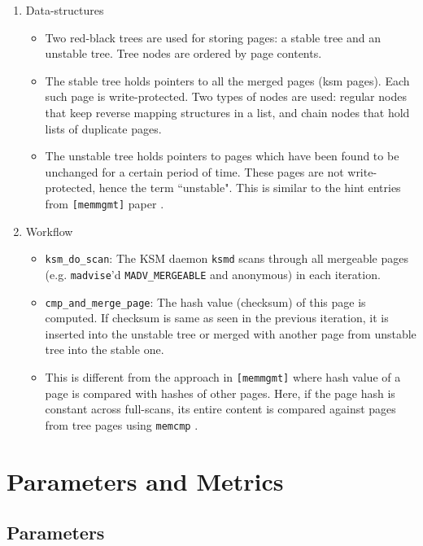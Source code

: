 \documentclass{article}
\begin{document}
\begin{enumerate}
\item Data-structures
    \begin{itemize}
        \item Two red-black trees are used for storing pages: a stable tree and an unstable tree. Tree nodes are ordered by page contents.
        \item The stable tree holds pointers to all the merged pages (ksm pages). Each such page is write-protected. Two types of nodes are used: regular nodes that keep reverse mapping structures in a list, and chain nodes that hold lists of duplicate pages.
        \item The unstable tree holds pointers to pages which have been found to be unchanged for a certain period of time. These pages are not write-protected, hence the term ``unstable". This is similar to the hint entries from \texttt{[memmgmt]} paper \cite{memmgmt}.
    \end{itemize}
\item Workflow
    \begin{itemize}
        \item \texttt{ksm\_do\_scan}: The KSM daemon \texttt{ksmd} scans through all mergeable pages (e.g. \texttt{madvise}'d \texttt{MADV\_MERGEABLE} and anonymous) in each iteration.
        \item \texttt{cmp\_and\_merge\_page}: The hash value (checksum) of this page is computed. If checksum is same as seen in the previous iteration, it is inserted into the unstable tree or merged with another page from unstable tree into the stable one.
        \item This is different from the approach in \texttt{[memmgmt]} \cite{memmgmt} where hash value of a page is compared with hashes of other pages. Here, if the page hash is constant across full-scans, its entire content is compared against pages from tree pages using \texttt{memcmp} \cite{memcmp_pages}.
    \end{itemize}
\end{enumerate}

\newpage

\section{Parameters and Metrics}
\label{sec:params_metrics}

\subsection{Parameters}
\label{sec:params}
\end{document}
